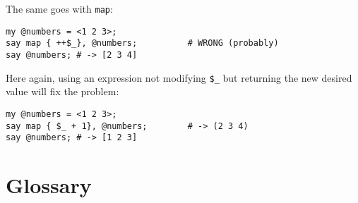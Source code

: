 \begin{enumerate}
The same goes with {\tt map}:

\begin{verbatim}
my @numbers = <1 2 3>;
say map { ++$_}, @numbers;          # WRONG (probably)
say @numbers; # -> [2 3 4]
\end{verbatim}
%

Here again, using an expression not modifying \verb'$_' 
but returning the new desired value will fix the problem:

\begin{verbatim}
my @numbers = <1 2 3>;
say map { $_ + 1}, @numbers;        # -> (2 3 4)
say @numbers; # -> [1 2 3]
\end{verbatim}
%

\end{enumerate}



\section{Glossary}

